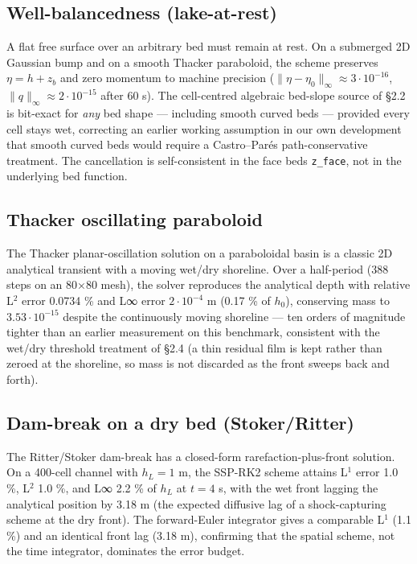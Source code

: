 \subsection{Well-balancedness
(lake-at-rest)}

A flat free surface over an arbitrary bed must remain at rest. On a
submerged 2D Gaussian bump and on a smooth Thacker paraboloid, the
scheme preserves \(\eta = h + z_b\) and zero momentum to machine
precision (\(\|\eta - \eta _{0}\|_\infty \approx 3\cdot 10^{-16}\),
\(\|q\|_\infty \approx 2\cdot 10^{-15}\) after 60 s). The cell-centred
algebraic bed-slope source of §2.2 is bit-exact for \emph{any} bed shape
--- including smooth curved beds --- provided every cell stays wet,
correcting an earlier working assumption in our own development that
smooth curved beds would require a Castro--Parés path-conservative
treatment. The cancellation is self-consistent in the face beds
\texttt{z\_face}, not in the underlying bed function.

\subsection{Thacker oscillating
paraboloid}

The Thacker planar-oscillation solution on a paraboloidal basin
\citep{Thacker1981} is a classic 2D analytical transient with a moving
wet/dry shoreline. Over a half-period (388 steps on an 80×80 mesh), the
solver reproduces the analytical depth with relative L$^{2}$ error 0.0734 \%
and L∞ error \(2\cdot 10^{-4}\) m (0.17 \% of \(h_{0}\)), conserving
mass to \(3.53\cdot 10^{-15}\) despite the continuously moving shoreline
--- ten orders of magnitude tighter than an earlier measurement on this
benchmark, consistent with the wet/dry threshold treatment of §2.4 (a
thin residual film is kept rather than zeroed at the shoreline, so mass
is not discarded as the front sweeps back and forth).

\subsection{Dam-break on a dry bed
(Stoker/Ritter)}

The Ritter/Stoker dam-break \citep{Stoker1957} has a closed-form
rarefaction-plus-front solution. On a 400-cell channel with \(h_L = 1\)
m, the SSP-RK2 scheme attains L$^{1}$ error 1.0 \%, L$^{2}$ 1.0 \%, and L∞ 2.2 \%
of \(h_L\) at \(t = 4\) s, with the wet front lagging the analytical
position by 3.18 m (the expected diffusive lag of a shock-capturing
scheme at the dry front). The forward-Euler integrator gives a
comparable L$^{1}$ (1.1 \%) and an identical front lag (3.18 m), confirming
that the spatial scheme, not the time integrator, dominates the error
budget.

